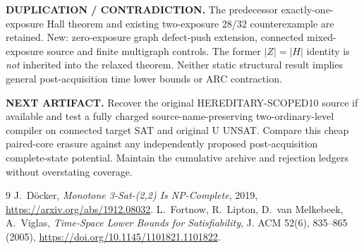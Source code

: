 \documentclass[11pt]{article}
\begin{document}
\textbf{DUPLICATION / CONTRADICTION.} The predecessor exactly-one-exposure Hall theorem and existing two-exposure 28/32 counterexample are retained. New: zero-exposure graph defect-push extension, connected mixed-exposure source and finite multigraph controls. The former $|Z|=|H|$ identity is \emph{not} inherited into the relaxed theorem. Neither static structural result implies general post-acquisition time lower bounds or ARC contraction.

\textbf{NEXT ARTIFACT.} Recover the original HEREDITARY-SCOPED10 source if available and test a fully charged source-name-preserving two-ordinary-level compiler on connected target SAT and original U UNSAT. Compare this cheap paired-core erasure against any independently proposed post-acquisition complete-state potential. Maintain the cumulative archive and rejection ledgers without overstating coverage.

\begin{thebibliography}{9}
 J.~D\"ocker, \emph{Monotone 3-Sat-(2,2) Is NP-Complete}, 2019, \url{https://arxiv.org/abs/1912.08032}.
 L.~Fortnow, R.~Lipton, D.~van Melkebeek, A.~Viglas, \emph{Time-Space Lower Bounds for Satisfiability}, J. ACM 52(6), 835--865 (2005), \url{https://doi.org/10.1145/1101821.1101822}.
\end{thebibliography}
\end{document}
